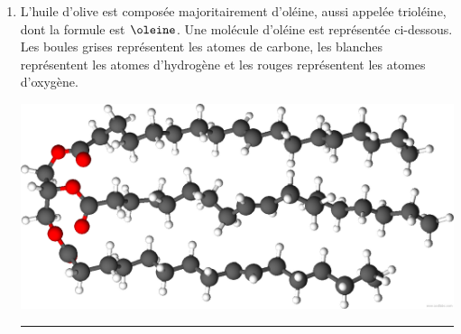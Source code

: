 \documentclass[12pt,a4paper]{article}
\begin{document}
\begin{enumerate}
\hrule{}
\vspace{5pt}
\item L'huile d'olive est composée majoritairement d'oléine, aussi appelée trioléine, dont la formule est $\oleine$.
Une molécule d'oléine est représentée ci-dessous.
Les boules grises représentent les atomes de carbone, les blanches représentent les atomes d'hydrogène et les rouges représentent les atomes d'oxygène.
\begin{center}
\includegraphics[scale=0.2]{images/oleine.png}
\end{center}
\hrule{}
\end{enumerate}
\end{document}
